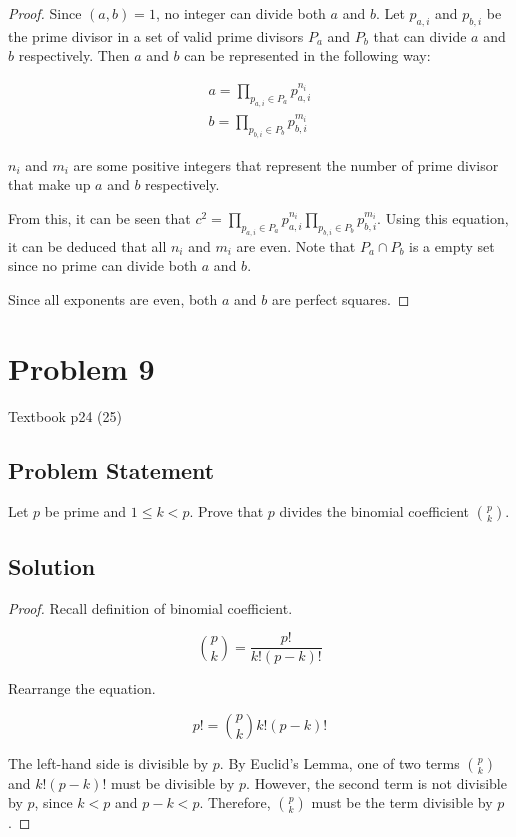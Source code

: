 \documentclass{article}
\begin{document}
\begin{proof}
	Since $(a, b) = 1$, no integer can divide both $a$ and $b$. Let $p_{a,i}$ and $p_{b,i}$ be the prime divisor in a set of valid prime divisors $P_a$ and $P_b$ that can divide $a$ and $b$ respectively. Then $a$ and $b$ can be represented in the following way:

	\begin{align*}
		a = \prod_{p_{a,i} \in P_a} p_{a,i}^{n_i} \\
		b = \prod_{p_{b,i} \in P_b} p_{b,i}^{m_i}
	\end{align*}

	$n_i$ and $m_i$ are some positive integers that represent the number of prime divisor that make up $a$ and $b$ respectively.

	From this, it can be seen that $c^2 = \prod_{p_{a,i} \in P_a} p_{a,i}^{n_i} \prod_{p_{b,i} \in P_b} p_{b,i}^{m_i}$. Using this equation, it can be deduced that all $n_i$ and $m_i$ are even. Note that $P_a \cap P_b$ is a empty set since no prime can divide both $a$ and $b$.

	Since all exponents are even, both $a$ and $b$ are perfect squares.
\end{proof}

\section*{Problem 9}

Textbook p24 (25)

\subsection*{Problem Statement}

Let $p$ be prime and $1 \leq k < p$. Prove that $p$ divides the binomial coefficient $\binom{p}{k}$.

\subsection*{Solution}

\begin{proof}
	Recall definition of binomial coefficient.

	$$
		\binom{p}{k} = \frac{p!}{k!(p - k)!}
	$$

	Rearrange the equation.

	$$
		p! = \binom{p}{k} k! (p - k)!
	$$

	The left-hand side is divisible by $p$. By Euclid's Lemma, one of two terms $\binom{p}{k}$ and $k! (p - k)!$ must be divisible by $p$. However, the second term is not divisible by $p$, since $k < p$ and $p - k < p$. Therefore, $\binom{p}{k}$ must be the term divisible by $p$.
\end{proof}
\end{document}
